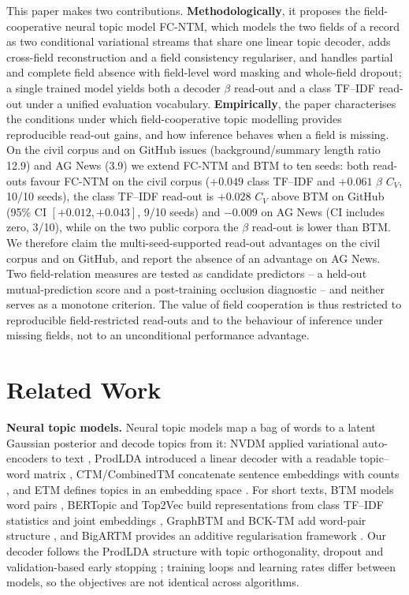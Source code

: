 \documentclass[Journal,letterpaper,NoLists]{ascelike-new}
\newcommand{\fcntm}{FC-NTM}
\begin{document}
This paper makes two contributions. \textbf{Methodologically}, it proposes the field-cooperative
neural topic model \fcntm{}, which models the two fields of a record as two conditional variational
streams that share one linear topic decoder, adds cross-field reconstruction and a field
consistency regulariser, and handles partial and complete field absence with field-level word
masking and whole-field dropout; a single trained model yields both a decoder $\beta$ read-out and
a class TF--IDF read-out under a unified evaluation vocabulary. \textbf{Empirically}, the paper characterises the conditions under which field-cooperative topic
modelling provides reproducible read-out gains, and how inference behaves when a field is missing.
On the civil corpus and on GitHub issues (background/summary length ratio 12.9) and AG News (3.9)
we extend \fcntm{} and BTM to ten seeds: both read-outs favour \fcntm{} on the civil corpus
($+0.049$ class TF--IDF and $+0.061$ $\beta$ $C_V$, 10/10 seeds), the class TF--IDF read-out is
$+0.028$ $C_V$ above BTM on GitHub (95\% CI $[+0.012,+0.043]$, 9/10 seeds) and $-0.009$ on AG News
(CI includes zero, 3/10), while on the two public corpora the $\beta$ read-out is lower than BTM.
We therefore claim the multi-seed-supported read-out advantages on the civil corpus and on GitHub,
and report the absence of an advantage on AG News. Two field-relation measures
are tested as candidate predictors -- a held-out mutual-prediction score and a post-training
occlusion diagnostic -- and neither serves as a monotone criterion. The value of field cooperation
is thus restricted to reproducible field-restricted read-outs and to the behaviour of inference
under missing fields, not to an unconditional performance advantage.

\section{Related Work}

\noindent\textbf{Neural topic models.} Neural topic models map a bag of words to a latent Gaussian posterior and decode topics from it:
NVDM applied variational auto-encoders to text \cite{miao2016nvdm}, ProdLDA introduced a linear
decoder with a readable topic--word matrix \cite{srivastava2017avitm}, CTM/CombinedTM concatenate
sentence embeddings with counts \cite{bianchi2021ctm}, and ETM defines topics in an embedding space
\cite{dieng2020etm}. For short texts, BTM models word pairs \cite{yan2013btm}, BERTopic and Top2Vec
build representations from class TF--IDF statistics and joint embeddings
\cite{grootendorst2022bertopic,angelov2020top2vec}, GraphBTM and BCK-TM add word-pair structure
\cite{zhu2018graphbtm,zhang2020bcktm}, and BigARTM provides an additive regularisation framework
\cite{vorontsov2015bigartm}. Our decoder follows the ProdLDA structure with topic orthogonality,
dropout \cite{srivastava2014dropout} and validation-based early stopping \cite{prechelt1998early};
training loops and learning rates differ between models, so the objectives are not identical
across algorithms.
\end{document}
